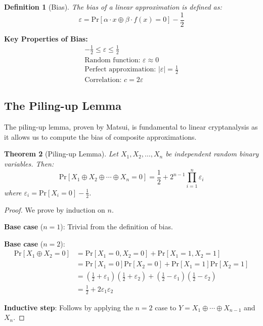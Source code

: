 \documentclass[12pt,a4paper]{article}
\newtheorem{theorem}{Theorem}[section]
\newtheorem{definition}[theorem]{Definition}
\newcommand{\bias}{\varepsilon}
\newcommand{\prob}[1]{\text{Pr}[#1]}
\newcommand{\xor}{\oplus}
\begin{document}
\begin{definition}[Bias]
The bias of a linear approximation is defined as:
$$\bias = \prob{\alpha \cdot x \xor \beta \cdot f(x) = 0} - \frac{1}{2}$$
\end{definition}

\begin{mathematicsbox}
\textbf{Key Properties of Bias:}
\begin{align}
-\frac{1}{2} \leq \bias \leq \frac{1}{2} \\
\text{Random function: } \bias \approx 0 \\
\text{Perfect approximation: } |\bias| = \frac{1}{2} \\
\text{Correlation: } c = 2\bias
\end{align}
\end{mathematicsbox}

\subsection{The Piling-up Lemma}

The piling-up lemma, proven by Matsui, is fundamental to linear cryptanalysis as it allows us to compute the bias of composite approximations.

\begin{theorem}[Piling-up Lemma]
Let $X_1, X_2, \ldots, X_n$ be independent random binary variables. Then:
$$\prob{X_1 \xor X_2 \xor \cdots \xor X_n = 0} = \frac{1}{2} + 2^{n-1} \prod_{i=1}^n \bias_i$$
where $\bias_i = \prob{X_i = 0} - \frac{1}{2}$.
\end{theorem}

\begin{proof}
We prove by induction on $n$.

\textbf{Base case} ($n=1$): Trivial from the definition of bias.

\textbf{Base case} ($n=2$): 
\begin{align}
\prob{X_1 \xor X_2 = 0} &= \prob{X_1 = 0, X_2 = 0} + \prob{X_1 = 1, X_2 = 1} \\
&= \prob{X_1 = 0}\prob{X_2 = 0} + \prob{X_1 = 1}\prob{X_2 = 1} \\
&= \left(\frac{1}{2} + \bias_1\right)\left(\frac{1}{2} + \bias_2\right) + \left(\frac{1}{2} - \bias_1\right)\left(\frac{1}{2} - \bias_2\right) \\
&= \frac{1}{2} + 2\bias_1\bias_2
\end{align}

\textbf{Inductive step}: Follows by applying the $n=2$ case to $Y = X_1 \xor \cdots \xor X_{n-1}$ and $X_n$.
\end{proof}
\end{document}
